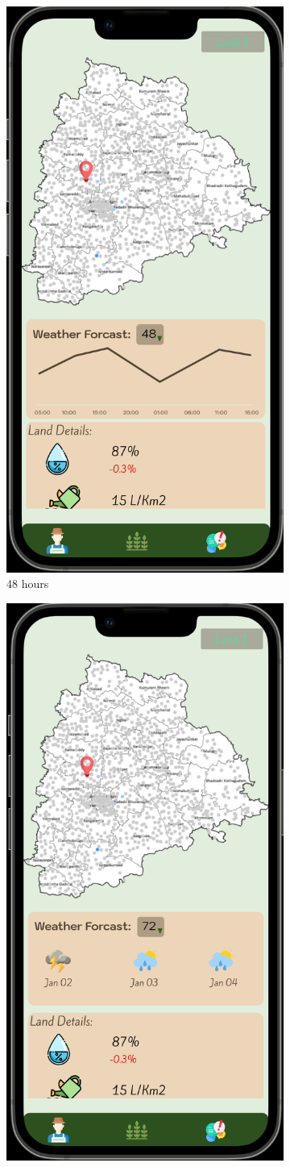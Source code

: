 \begin{figure}[ht]
\begin{subfigure}[b]{0.6\linewidth}
    \includegraphics[width=0.6\linewidth]{figures/forcastchange3.png} 
    \caption{48 hours} 
    \label{fig:b} 
    \vspace{4ex}
  \end{subfigure} 
  \begin{subfigure}[b]{0.6\linewidth}
    \centering
    \includegraphics[width=0.6\linewidth]{figures/forcastchange4.png} 

\end{subfigure}
\end{figure}
